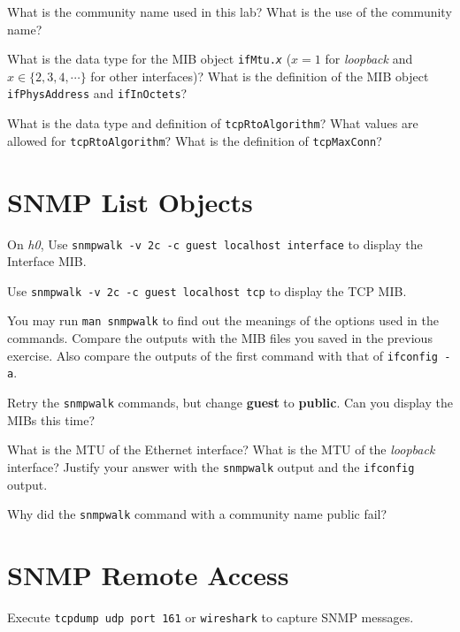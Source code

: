 \documentclass{../UTNetLab}
\begin{document}
    \begin{report}
        \item What is the community name used in this lab? What is the use of the
            community name?
        
        \item What is the data type for the MIB object \texttt{ifMtu.\textit{x}} ($x=1$ for \textit{loopback} and $x \in \{2,3,4,\cdots\}$ for other interfaces)? What is the definition of the MIB object \texttt{ifPhysAddress} and \texttt{ifInOctets}?
        
        \item What is the data type and definition of \texttt{tcpRtoAlgorithm}? What values are allowed for \texttt{tcpRtoAlgorithm}? What is the definition of \texttt{tcpMaxConn}?
    \end{report}

\section{SNMP List Objects}
    On \textit{h0},
    Use \lstinline[emph={guest}]{snmpwalk -v 2c -c guest localhost interface} to display the Interface MIB.

    Use \lstinline[emph={guest}]{snmpwalk -v 2c -c guest localhost tcp} to display the TCP MIB.

    You may run \lstinline{man snmpwalk} to find out the meanings of the options used in the commands.
    Compare the outputs with the MIB files you saved in the previous exercise.
    Also compare the outputs of the first command with that of \lstinline{ifconfig -a}.

    Retry the \lstinline{snmpwalk} commands, but change \textbf{guest} to \textbf{public}.
    Can you display the MIBs this time?
    
    \begin{report}
        \item What is the MTU of the Ethernet interface? What is the MTU of the \textit{loopback} interface? Justify your answer with the \lstinline{snmpwalk} output and the \lstinline{ifconfig} output.
        
        \item Why did the \lstinline{snmpwalk} command with a community name public fail?
    \end{report}

\section{SNMP Remote Access}
    Execute \lstinline[morekeywords={[3]udp,port}]{tcpdump udp port 161} or \lstinline{wireshark} to capture SNMP messages.
\end{document}
